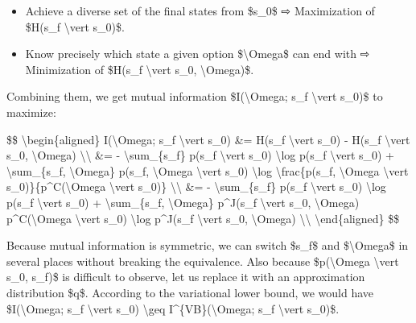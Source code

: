 \begin{itemize}
\tightlist
\item
  Achieve a diverse set of the final states from \$s\_0\$ ⇨ Maximization of \$H(s\_f \textbackslash vert s\_0)\$.
\item
  Know precisely which state a given option \$\textbackslash Omega\$ can end with ⇨ Minimization of \$H(s\_f \textbackslash vert s\_0, \textbackslash Omega)\$.
\end{itemize}

Combining them, we get mutual information \$I(\textbackslash Omega; s\_f \textbackslash vert s\_0)\$ to maximize:

\$\$ \textbackslash begin\{aligned\} I(\textbackslash Omega; s\_f \textbackslash vert s\_0) \&= H(s\_f \textbackslash vert s\_0) - H(s\_f \textbackslash vert s\_0, \textbackslash Omega) \textbackslash\textbackslash{} \&= - \textbackslash sum\_\{s\_f\} p(s\_f \textbackslash vert s\_0) \textbackslash log p(s\_f \textbackslash vert s\_0) + \textbackslash sum\_\{s\_f, \textbackslash Omega\} p(s\_f, \textbackslash Omega \textbackslash vert s\_0) \textbackslash log \textbackslash frac\{p(s\_f, \textbackslash Omega \textbackslash vert s\_0)\}\{p\^{}C(\textbackslash Omega \textbackslash vert s\_0)\} \textbackslash\textbackslash{} \&= - \textbackslash sum\_\{s\_f\} p(s\_f \textbackslash vert s\_0) \textbackslash log p(s\_f \textbackslash vert s\_0) + \textbackslash sum\_\{s\_f, \textbackslash Omega\} p\^{}J(s\_f \textbackslash vert s\_0, \textbackslash Omega) p\^{}C(\textbackslash Omega \textbackslash vert s\_0) \textbackslash log p\^{}J(s\_f \textbackslash vert s\_0, \textbackslash Omega) \textbackslash\textbackslash{} \textbackslash end\{aligned\} \$\$

Because mutual information is symmetric, we can switch \$s\_f\$ and \$\textbackslash Omega\$ in several places without breaking the equivalence. Also because \$p(\textbackslash Omega \textbackslash vert s\_0, s\_f)\$ is difficult to observe, let us replace it with an approximation distribution \$q\$. According to the variational lower bound, we would have \$I(\textbackslash Omega; s\_f \textbackslash vert s\_0) \textbackslash geq I\^{}\{VB\}(\textbackslash Omega; s\_f \textbackslash vert s\_0)\$.

